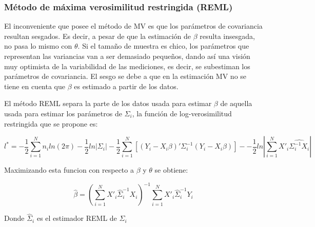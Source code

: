 \documentclass[spanish]{article}
\numberwithin{figure}{subsection}
\numberwithin{equation}{subsection}
\numberwithin{table}{subsection}
\begin{document}
\subsubsection{Método de máxima verosimilitud restringida (REML)}

El inconveniente que posee el método de MV es que los parámetros de covariancia
resultan sesgados. Es decir, a pesar de que la estimación de $\beta$ resulta
insesgada, no pasa lo mismo con $\theta$. Si el tamaño de muestra es chico, los
parámetros que representan las variancias van a ser demasiado pequeños, dando
así una visión muy optimista de la variabilidad de las mediciones, es decir, se
subestiman los parámetros de covariancia. El sesgo se debe a que en la
estimación MV no se tiene en cuenta que $\beta$ es estimado a partir de los
datos.

El método REML separa la parte de los datos usada para estimar $\beta$ de
aquella usada para estimar los parámetros de $\varSigma_i$, la función de
log-verosimilitud restringida que se propone es:

\begin{equation}
\label{REML}
	l^* = -\frac{1}{2} \sum_{i=1}^{N}n_i ln(2\pi) - \frac{1}{2}ln|\varSigma_i| -
	\frac{1}{2} \sum_{i=1}^{N} [(Y_i - X_i\beta)'
	\varSigma_i^{-1} (Y_i - X_i\beta)] -
	- \frac{1}{2} ln |\sum_{i=1}^{N} X'_i \hat{\varSigma_i^{-1} X_i}|
\end{equation}

Maximizando esta funcion con respecto a $\beta$ y $\theta$ se obtiene:

\[ \hat{\beta} = (\sum_{i=1}^{N} X'_i \hat{\varSigma}_i^{-1} X_i)^{-1}
\sum_{i=1}^{N} X'_i \hat{\varSigma}_i^{-1} Y_i\]

Donde $\hat{\varSigma}_i$ es el estimador REML de ${\varSigma_i}$



\end{document}
